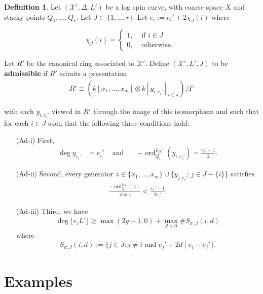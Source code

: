 \documentclass{amsart}
\makeatletter
\theoremstyle{plain}
\theoremstyle{definition}
\newtheorem{defn}[thm]{Definition}
\theoremstyle{remark}
\numberwithin{equation}{section}
\DeclareMathOperator{\ord}{ord}
\newcommand\sx{\mathscr X}
\newcommand \subhalf[1]{\frac{{#1} - 1}{2{#1}}}
\newcommand{\halfcan}{L}
\newcommand{\customlabel}[2]{%
   \protected@write \@auxout {}{\string \newlabel {#1}{{#2}{\thepage}{#2}{#1}{}} }%
   \hypertarget{#1}{#2}
}
\makeatother
\begin{document}
\begin{defn}
\label{defn:admissible}
Let $(\sx', \Delta, L')$ be a log spin
curve, with coarse space $X$ and stacky points $Q_1, \ldots, Q_r$.  Let $J \subset
\{1, \ldots, r\}$. Let $e_i := e_i'+ 2 \chi_J (i)$ where

\[
\chi_J(i) = \begin{cases}
	1, &\text{ if }i \in J\\
	0, &\text{ otherwise. } 
\end{cases}
\]

Let $R'$ be the canonical ring associated to $\sx'$. Define $(\sx', \halfcan', J)$
to be {\bf admissible} if $R'$ admits a presentation
\begin{align*}
	R' \cong \left( k[x_1, \ldots, x_m] \otimes k[y_{i, e_i'}]_{i \in J} \right)/I'
\end{align*}

\noindent
with each $y_{i, e_i'}$ viewed in $R'$ through the image of this isomorphism and such that for each $i \in J$ such that the following
three conditions hold:
\begin{enumerate}
	\item[\customlabel{custom:Ad-i}{(Ad-i)}] First, 
		\begin{align*}
		\deg y_{e_i'} &= e_i'  &\text{ and } &&-\ord_{Q_i}^{\halfcan_X'}(y_{i, e_i'})
			= \frac{e_i'- 1}{2}.
		\end{align*}
	\item[\customlabel{custom:Ad-ii}{(Ad-ii)}] Second, every generator $z 
		\in \{x_1, \ldots, x_m\} \cup \{y_{j, e_i'}: j\in J - \{i\} \}$ 
		satisfies
		\begin{align*}
			\frac{-\ord_{Q_i}^{\halfcan_X'}(z)}{\deg z} < \subhalf {e_i'}.
		\end{align*}
	\item[\customlabel{custom:Ad-iii}{(Ad-iii)}] Third, we have
		\begin{align*}
			\deg \lfloor e_i L' \rfloor \geq \max(2g - 1,0) + \max_{d \geq 0} \# S_{\sigma, J}(i, d)
		\end{align*}
		where
		\begin{align*}
			S_{\sigma, J}(i, d) := \{j \in J : j \neq i \text{ and } e_j'+2d
			\mid e_i - e_j'\}.
		\end{align*}
\end{enumerate}
\end{defn}


\section{Examples}
\label{sec:examples}
\end{document}
